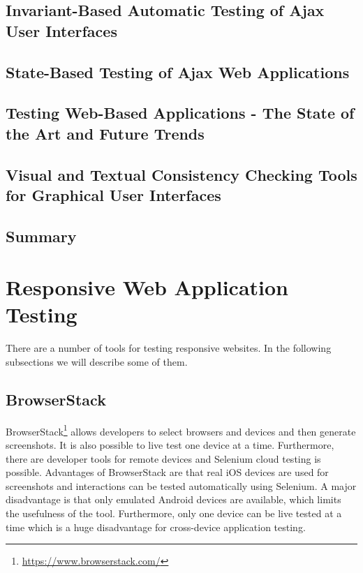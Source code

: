 \subsection{Invariant-Based Automatic Testing of Ajax User Interfaces}

\subsection{State-Based Testing of Ajax Web Applications}

\subsection{Testing Web-Based Applications - The State of the Art and Future Trends}

\subsection{Visual and Textual Consistency Checking Tools for Graphical User Interfaces}

\subsection{Summary}

\section{Responsive Web Application Testing}

There are a number of tools for testing responsive websites. In the following subsections we will describe some of them.

\subsection{BrowserStack}

BrowserStack\footnote{\url{https://www.browserstack.com/}} allows developers to select browsers and devices and then generate screenshots. It is also possible to live test one device at a time. Furthermore, there are developer tools for remote devices and Selenium cloud testing is possible. Advantages of BrowserStack are that real iOS devices are used for screenshots and interactions can be tested automatically using Selenium. A major disadvantage is that only emulated Android devices are available, which limits the usefulness of the tool. Furthermore, only one device can be live tested at a time which is a huge disadvantage for cross-device application testing. 

